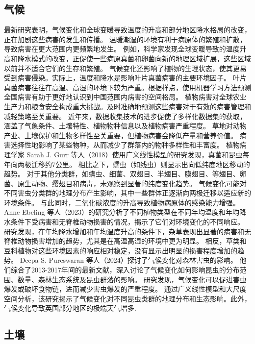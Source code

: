 \documentclass[AutoFakeBold]{LZUThesis-PgD&PhD}
\begin{document}
	\subsection{气候}
	
	最新研究表明，气候变化和全球变暖导致温度的升高和部分地区降水格局的改变，正在加剧这些病害的发生和传播。
	温暖潮湿的环境有利于病原体的繁殖和扩散，导致病害在更大范围内更频繁地发生。
	例如，科学家发现全球变暖导致的温度升高和降水模式的改变，正促使一些病原真菌和卵菌向新的地理区域扩展，这些区域以前并不适合它们的生存和繁殖。
	气候变化还影响了植物的生理状态，使其更易受到病害侵染。实际上，温度和降水是影响叶片真菌病害的主要环境因子。
	叶片真菌病害往往在高温、高湿的环境下较为严重。根据样点，使用机器学习方法预测全国病害有助于更好地认识到中国范围内病害的空间格局。
	植物病害对全球农业生产力和粮食安全构成重大挑战。及时准确地预测这些病害对于有效的病害管理和减轻策略至关重要。
	近年来，数据收集技术的进步促使了多样化数据集的获取，涵盖了气象条件、土壤特性、植物物种信息以及植物病害严重程度。
	草地对动物产业、土壤保护和生物多样性至关重要，但植物病害会降低产量和营养价值\cite{chakraborty2018climate}。
	病害选择性地影响了某些物种，从而减少了群落内的物种多样性和丰富度\cite{grunberg2023impact}。
	植物病理学家 Sarah J. Gurr 等人（2018）使用广义线性模型的研究发现，真菌和昆虫每年向两极迁移约7公里。
	相比之下，蠕虫（如线虫）则显示出向低纬度地区移动的趋势。
	对于其他分类群，如螨虫、细菌、双翅目、半翅目、膜翅目、等翅目、卵菌、原生动物、缨翅目和病毒，未观察到显著的纬度变化趋势。
	气候变化可能对不同害虫分类群的地理分布产生影响，其中一些群体正逐渐向两极迁移以适应新的环境条件。
	与此同时，二氧化碳浓度的升高导致植物病原体的感染能力增强\cite{sukumar2018co2}。
	Anne Ebeling 等人（2023）的研究分析了不同植物类型在不同年均温度和年均降水条件下受病害和无脊椎动物损害的情况，揭示了它们对环境变化的不同响应。
	研究发现，在年均降水增加和年均温度升高的条件下，杂草表现出显著的病害和无脊椎动物损害增加的趋势，尤其是在高温高湿的环境中更为明显。
	相反，草类和豆科植物对这些环境因素的响应相对稳定，没有显示出明显的损害程度增加的趋势\cite{ebeling2023response}。
	Deepa S. Pureswaran 等人（2024）探讨了气候变化对森林害虫的影响。
	他们综合了2013-2017年间的最新文献，深入讨论了气候变化如何影响昆虫的分布范围、数量、森林生态系统及昆虫群落的影响。
	研究发现，气候变化可以促进害虫爆发或破坏食物链，进而减少害虫爆发的严重程度。
	通过广义线性模型和大尺度空间分析，该研究揭示了气候变化对不同昆虫类群的地理分布和生态影响。此外，气候变化导致英国部分地区的极端天气增多\cite{angelotti2024forest}.
	
	\subsection{土壤}
	
\end{document}

